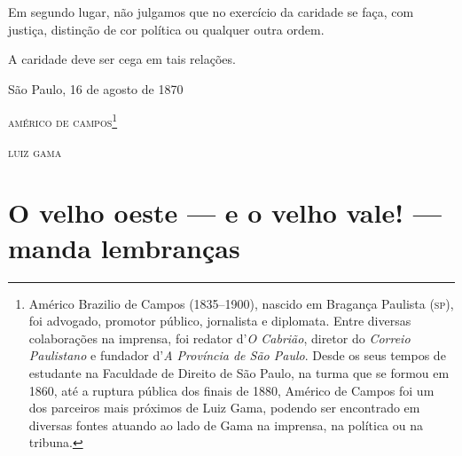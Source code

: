 Em segundo lugar, não julgamos que no exercício da caridade se faça, com
justiça, distinção de cor política ou qualquer outra ordem.

A caridade deve ser cega em tais relações.

\begin{flushright}
São Paulo, 16 de agosto de 1870

\textsc{américo de campos}\footnote{ Américo Brazilio de Campos (1835--1900),
  nascido em Bragança Paulista (\textsc{sp}), foi advogado, promotor público,
  jornalista e diplomata. Entre diversas colaborações na imprensa, foi
  redator d'\emph{O Cabrião}, diretor do \emph{Correio Paulistano} e
  fundador d'\emph{A Província de São Paulo}. Desde os seus tempos de
  estudante na Faculdade de Direito de São Paulo, na turma que se formou
  em 1860, até a ruptura pública dos finais de 1880, Américo de Campos
  foi um dos parceiros mais próximos de Luiz Gama, podendo ser
  encontrado em diversas fontes atuando ao lado de Gama na imprensa, na
  política ou na tribuna.}

\textsc{luiz gama}
\end{flushright}

\part{O velho oeste --- e o velho vale! --- manda lembranças}

